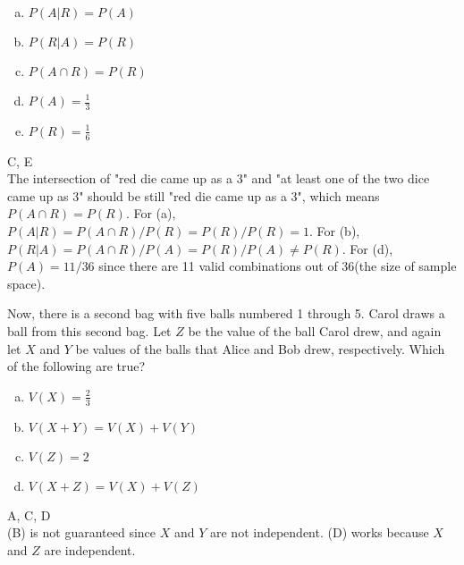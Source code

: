 \begin{enumerate}[(a)]
	\item  $P(A|R) = P(A)$
    
	\item  $P(R|A) = P(R)$
    
	\item  $P(A \cap R) = P(R)$
    
	\item  $P(A) = \frac{1}{3}$
    
	\item  $P(R) = \frac{1}{6}$

\end{enumerate}
\begin{solution}

C, E
\\
The intersection of "red die came up as a 3" and "at least one of the two dice came up as 3" should be still "red die came up as a 3", which means $P(A \cap R) = P(R)$. For (a), $P(A|R) = P(A \cap R)/P(R) = P(R)/P(R) = 1$. For (b), $P(R|A) = P(A \cap R)/P(A) = P(R)/P(A) \neq P(R)$. For (d), $P(A) = 11/36$ since there are 11 valid combinations out of 36(the size of sample space).

\end{solution}


Now, there is a second bag with five balls numbered 1 through 5. Carol draws a ball from this second bag. Let $Z$ be the value of the ball Carol drew, and again let $X$ and $Y$ be values of the balls that Alice and Bob drew, respectively. Which of the following are true? 
\begin{enumerate} [(a)]
    \item $V(X) = \frac{2}{3}$
    \item $V(X+Y) = V(X)+V(Y)$
    \item $V(Z) = 2$
    \item $V(X+Z) = V(X)+V(Z)$
\end{enumerate}
\begin{solution}
A, C, D
\\
(B) is not guaranteed since $X$ and $Y$ are not independent. (D) works because $X$ and $Z$ are independent.
\end{solution}


